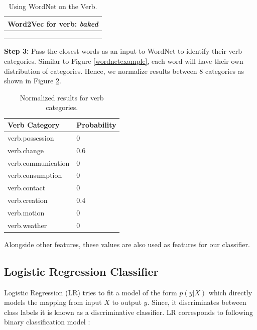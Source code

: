 \documentclass[11pt]{article}
\begin{document}
\begin{table}[h!]
\centering
\begin{tabular}{ | m{30em} |}
\hline
Word2Vec for verb: \textit{baked} \\
\hline
["unbaked", 0.602738618850708]\\
\hline
["cooked", 0.6022148728370667]\\
\hline
["bakes", 0.5771548748016357]\\
\hline
\end{tabular}
\caption{Using WordNet on the Verb.}
\label{word2vecexample}
\end{table}

\textbf{Step 3:} Pass the closest words as an input to WordNet to identify their verb categories. Similar to Figure \ref{wordnetexample}, each word will have their own distribution of categories. Hence, we normalize results between 8 categories as shown in Figure \ref{normalized}.

\begin{table}[h!]
\centering
\begin{tabular}{ | m{20em} | m{5em} |}
\hline
\textbf{Verb Category} & \textbf{Probability} \\
\hline
verb.possession & 0\\
\hline
verb.change & 0.6\\
\hline
verb.communication & 0\\
\hline
verb.consumption & 0\\
\hline
verb.contact & 0\\
\hline
verb.creation & 0.4\\
\hline
verb.motion & 0\\
\hline
verb.weather & 0\\
\hline
\end{tabular}
\caption{Normalized results for verb categories.}
\label{normalized}
\end{table}

Alongside other features, these values are also used as features for our classifier.

\subsection{Logistic Regression Classifier}\label{sec:logisticregressionclassifier}

Logistic Regression (LR) tries to fit a model of the form \begin{math} p(y|X) \end{math} which directly models the mapping from input \begin{math}X\end{math} to output \begin{math}y\end{math}. Since, it discriminates between class labels it is known as a discriminative classifier. LR corresponds to following binary classification model \citep{Murphy}:
\end{document}
